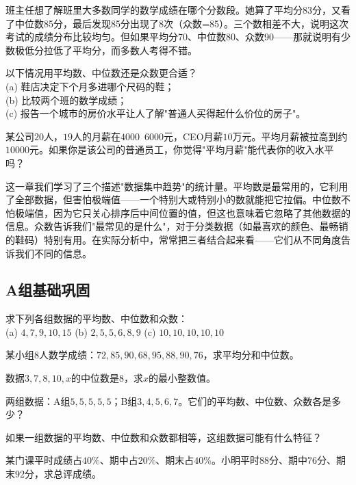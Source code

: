 \begin{example}
班主任想了解班里大多数同学的数学成绩在哪个分数段。她算了平均分83分，又看了中位数85分，最后发现85分出现了8次（众数=85）。三个数相差不大，说明这次考试的成绩分布比较均匀。但如果平均分70、中位数80、众数90——那就说明有少数极低分拉低了平均分，而多数人考得不错。
\end{example}

\begin{exercise}
\item 以下情况用平均数、中位数还是众数更合适？\\
(a) 鞋店决定下个月多进哪个尺码的鞋；\\
(b) 比较两个班的数学成绩；\\
(c) 报告一个城市的房价水平让人了解"普通人买得起什么价位的房子"。
\item 某公司$20$人，$19$人的月薪在$4000$~$6000$元，CEO月薪$10$万元。平均月薪被拉高到约$10000$元。如果你是该公司的普通员工，你觉得"平均月薪"能代表你的收入水平吗？
\end{exercise}


这一章我们学习了三个描述"数据集中趋势"的统计量。平均数是最常用的，它利用了全部数据，但害怕极端值——一个特别大或特别小的数就能把它拉偏。中位数不怕极端值，因为它只关心排序后中间位置的值，但这也意味着它忽略了其他数据的信息。众数告诉我们"最常见的是什么"，对于分类数据（如最喜欢的颜色、最畅销的鞋码）特别有用。在实际分析中，常常把三者结合起来看——它们从不同角度告诉我们不同的信息。


\subsection*{A组\quad 基础巩固}

\begin{exercise}
\item 求下列各组数据的平均数、中位数和众数：\\
(a) $4,7,9,10,15$ \qquad (b) $2,5,5,6,8,9$ \qquad (c) $10,10,10,10,10$
\item 某小组$8$人数学成绩：$72,85,90,68,95,88,90,76$，求平均分和中位数。
\item 数据$3,7,8,10,x$的中位数是$8$，求$x$的最小整数值。
\item 两组数据：A组$5,5,5,5,5$；B组$3,4,5,6,7$。它们的平均数、中位数、众数各是多少？
\item 如果一组数据的平均数、中位数和众数都相等，这组数据可能有什么特征？
\item 某门课平时成绩占$40\%$、期中占$20\%$、期末占$40\%$。小明平时$88$分、期中$76$分、期末$92$分，求总评成绩。
\end{exercise}

